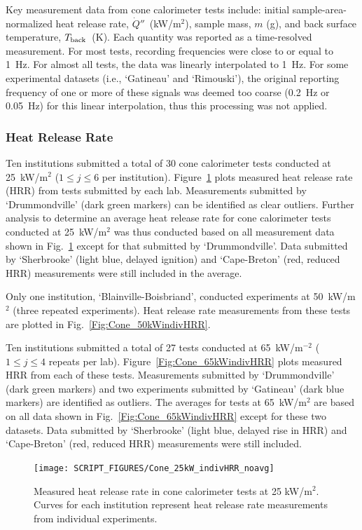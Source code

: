 \documentclass{book}
\begin{document}
Key measurement data from cone calorimeter tests include: initial sample-area-normalized heat release rate, $\dot{Q}''$~(kW/m$^2$), sample mass, $m$ (g), and back surface temperature, $T_{\rm back}$~(K). Each quantity was reported as a time-resolved measurement. For most tests, recording frequencies were close to or equal to 1~Hz. For almost all tests, the data was linearly interpolated to 1~Hz. For some experimental datasets (i.e., `Gatineau' and `Rimouski'), the original reporting frequency of one or more of these signals was deemed too coarse (0.2~Hz or 0.05~Hz) for this linear interpolation, thus this processing was not applied.

\subsubsection{Heat Release Rate}

Ten institutions submitted a total of 30 cone calorimeter tests conducted at 25~kW/m$^2$ ($1\le j\le6$ per institution). Figure~\ref{Fig:Cone_25kWindivHRR} plots measured heat release rate (HRR) from tests submitted by each lab. Measurements submitted by ‘Drummondville’ (dark green markers) can be identified as clear outliers. Further analysis to determine an average heat release rate for cone calorimeter tests conducted at 25~kW/m$^2$ was thus conducted based on all measurement data shown in Fig.~\ref{Fig:Cone_25kWindivHRR} except for that submitted by ‘Drummondville’. Data submitted by ‘Sherbrooke' (light blue, delayed ignition) and `Cape-Breton' (red, reduced HRR) measurements were still included in the average.

Only one institution, ‘Blainville-Boisbriand’, conducted experiments at 50~kW/m$^2$ (three repeated experiments). Heat release rate measurements from these tests are plotted in Fig.~\ref{Fig:Cone_50kWindivHRR}.

Ten institutions submitted a total of 27 tests conducted at 65~kW/m$^{-2}$ ($1\le j\le4$ repeats per lab). Figure~\ref{Fig:Cone_65kWindivHRR} plots measured HRR from each of these tests. Measurements submitted by ‘Drummondville’ (dark green markers) and two experiments submitted by ‘Gatineau’ (dark blue markers) are identified as outliers. The averages for tests at 65~kW/m$^2$ are based on all data shown in Fig.~\ref{Fig:Cone_65kWindivHRR} except for these two datasets. Data submitted by ‘Sherbrooke' (light blue, delayed rise in HRR) and `Cape-Breton' (red, reduced HRR) measurements were still included.

\begin{figure}
  \centering
  \texttt{[image: SCRIPT\_FIGURES/Cone\_25kW\_indivHRR\_noavg]}
  \caption{Measured heat release rate in cone calorimeter tests at 25 kW/m$^2$. Curves for each institution represent heat release rate measurements from individual experiments.}
  \label{Fig:Cone_25kWindivHRR}
\end{figure}
\end{document}
